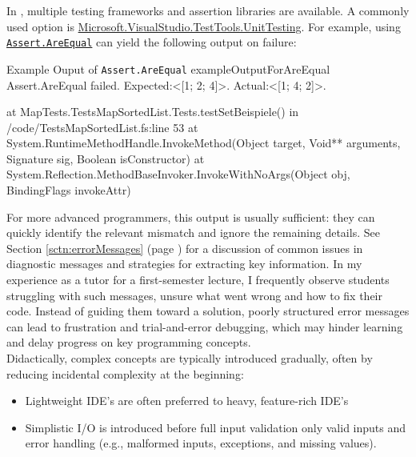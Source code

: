 \begin{justify}
In \fs{}, multiple testing frameworks and assertion libraries are available.
A commonly used option is \href{https://learn.microsoft.com/en-us/dotnet/api/microsoft.visualstudio.testtools.unittesting}{Microsoft.VisualStudio.TestTools.UnitTesting}.
For example, using \href{https://learn.microsoft.com/en-us/dotnet/api/microsoft.visualstudio.testtools.unittesting.assert.areequal?view=mstest-net-3.8}{\texttt{Assert.AreEqual}} can yield the following output on failure:
\end{justify}
\begin{fsharpoutput}%
{Example Ouput of \texttt{Assert.AreEqual}}%
{exampleOutputForAreEqual}
Assert.AreEqual failed. Expected:<[1; 2; 4]>. Actual:<[1; 4; 2]>.

    at MapTests.TestsMapSortedList.Tests.testSetBeispiele() in /code/TestsMapSortedList.fs:line 53
    at System.RuntimeMethodHandle.InvokeMethod(Object target, Void** arguments, Signature sig, Boolean isConstructor)
    at System.Reflection.MethodBaseInvoker.InvokeWithNoArgs(Object obj, BindingFlags invokeAttr)
\end{fsharpoutput}

\noindent For more advanced programmers, this output is usually sufficient: they can quickly identify the relevant mismatch and ignore the remaining details.
See Section \ref{sctn:errorMessages} (page \pageref{sctn:errorMessages}) for a discussion of common issues in diagnostic messages and strategies for extracting key information.
In my experience as a tutor for a first-semester lecture, I frequently observe students struggling with such messages, unsure what went wrong and how to fix their code.
Instead of guiding them toward a solution, poorly structured error messages can lead to frustration and trial-and-error debugging, which may hinder learning and delay progress on key programming concepts.\\[5pt]

Didactically, complex concepts are typically introduced gradually, often by reducing incidental complexity at the beginning:
\begin{itemize}
    \item Lightweight IDE's are often preferred to heavy, feature-rich IDE's
    \item Simplistic I/O is introduced before full input validation only valid inputs and error handling (e.g., malformed inputs, exceptions, and missing values).
\end{itemize}

